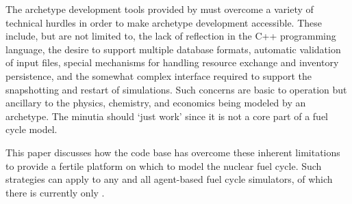 The archetype development tools provided by \cyclus must overcome a variety of 
technical hurdles in order to make archetype development accessible.  These 
include, but are not limited to, the lack of reflection in the C++ programming language, 
the desire to support multiple database formats, automatic validation of input files,
special mechanisms for handling resource exchange and inventory persistence, 
and the somewhat complex interface required to support the snapshotting and 
restart of simulations. Such concerns are basic to \cyclus operation but 
ancillary to the physics, chemistry, and economics being modeled by an archetype.
The minutia should `just work' since it is not a core part of a fuel cycle model.

This paper discusses how the \cyclus code base has overcome these inherent limitations
to provide a fertile platform on which to model the nuclear fuel cycle.
Such strategies can apply to any and all agent-based fuel cycle simulators, of which 
there is currently only \cyclus.
